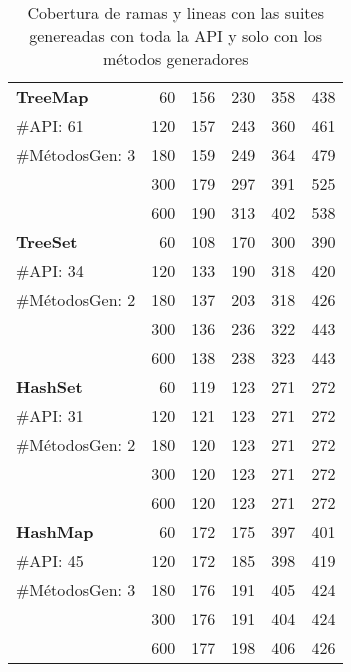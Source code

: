 \begin{table}[H]
{\begin{tabular}{l |r |cc |cc }
 \multirow{1}{*}{\textbf{TreeMap}} 
 & 60 & 156 & 230   & 358 & 438\\
  {\scriptsize \#API: 61  }& 120 & 157 & 243&  360& 461 \\
  {\scriptsize \#MétodosGen: 3}& 180 & 159 & 249 & 364 &479 \\
    & 300 & 179 & 297 & 391&  525 \\
  & 600 &  190&  313 & 402& 538 \\
\hline
 \multirow{1}{*}{\textbf{TreeSet}} 
  & 60 & 108 & 170 & 300 &390  \\
  {\scriptsize \#API: 34}& 120 & 133 & 190 & 318 & 420  \\
  {\scriptsize \#MétodosGen: 2}& 180 & 137 &  203 & 318 & 426  \\
    & 300 & 136 & 236 & 322&  443 \\
  & 600 & 138 & 238  & 323&  443\\
 \hline


 \multirow{1}{*}{\textbf{HashSet}} 
 & 60  &  119 &123 &271 &  272 \\
  {\scriptsize \#API: 31}& 120 & 121 &123 & 271 & 272 \\
  {\scriptsize \#MétodosGen: 2}& 180 & 120 & 123 &271  & 272 \\
    & 300 & 120 & 123 &271 &272   \\
  & 600 & 120 & 123 & 271& 272 \\
 
 \hline

\multirow{1}{*}{\textbf{HashMap}} 
& 60 & 172 & 175 & 397& 401 \\
  {\scriptsize \#API: 45}& 120 & 172 & 185  & 398 & 419 \\
  {\scriptsize \#MétodosGen: 3}& 180 &176 & 191  & 405 & 424  \\
    & 300 & 176 & 191 &404 &  424 \\
  & 600 & 177 & 198  &406 & 426  \\
\hline
 
 \end{tabular}%
}
\caption{Cobertura de ramas y lineas con las suites genereadas con toda la API y solo con los métodos generadores}
\label{tab:results-coverage}
 
\end{table}